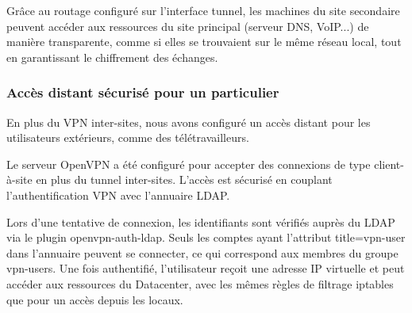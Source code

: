 Grâce au routage configuré sur l'interface tunnel, les machines du site secondaire peuvent accéder aux ressources du site principal (serveur DNS, VoIP...) de manière transparente, comme si elles se trouvaient sur le même réseau local, tout en garantissant le chiffrement des échanges.

\subsubsection{Accès distant sécurisé pour un particulier}

En plus du VPN inter-sites, nous avons configuré un accès distant pour les utilisateurs extérieurs, comme des télétravailleurs.

Le serveur OpenVPN a été configuré pour accepter des connexions de type client-à-site en plus du tunnel inter-sites. L'accès est sécurisé en couplant l'authentification VPN avec l'annuaire LDAP.

Lors d'une tentative de connexion, les identifiants sont vérifiés auprès du LDAP via le plugin openvpn-auth-ldap. Seuls les comptes ayant l'attribut title=vpn-user dans l'annuaire peuvent se connecter, ce qui correspond aux membres du groupe vpn-users. Une fois authentifié, l'utilisateur reçoit une adresse IP virtuelle et peut accéder aux ressources du Datacenter, avec les mêmes règles de filtrage iptables que pour un accès depuis les locaux.
